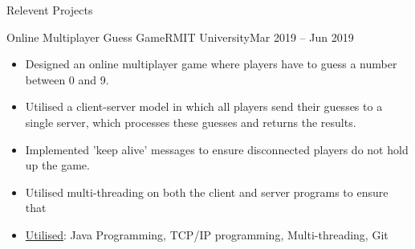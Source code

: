 \documentclass[]{mcdowellcv}
\begin{document}
\begin{cvsection}{Relevent Projects}
		\begin{cvsubsection}{Online Multiplayer Guess Game}{RMIT University}{Mar 2019 -- Jun 2019}
			\begin{itemize}
				\item Designed an online multiplayer game where players have to guess a number between 0 and 9.
				\item Utilised a client-server model in which all players send their guesses to a single server, which processes these guesses and returns the results.
				\item Implemented 'keep alive' messages to ensure disconnected players do not hold up the game.
				\item Utilised multi-threading on both the client and server programs to ensure that 
				\item \underline{Utilised}: Java Programming, TCP/IP programming, Multi-threading, Git
			\end{itemize}
		\end{cvsubsection}
\iffalse
-Worked in a team of four to develop a real time traffic controller system for two four-way intersections separated by a train crossing.
-The intersections were represented by a custom PCB our team designed and created, utilising NeoPixel LEDs as our traffic lights and push buttons as our pedestrian buttons. 
-The system itself was controlled by four separate micro-controller nodes (DE-10 Nano) running the QNX real time operating system, one for each intersection, one for the train crossing and one more as the controlling/watchdog system. 
-Each node was heavily multi threaded and networked IPC was utilised to communicate between nodes. 
-Node failure was accounted for in the design, with fail safe mechanisms employed to stop potentially dangerous scenarios, e.g. if the train crossing controller node went offline, the adjacent intersections would not route traffic towards the crossing.
-The lights realistically change, transitioning from green to yellow to red in real time, with the transitions being triggered by either timers, or the pedestrian buttons depending on the mode.
-The controller node featured a command line interface, which allowed individual control over each other nodes mode, light configuration and timing. 
\fi


\end{cvsection}
\end{document}
